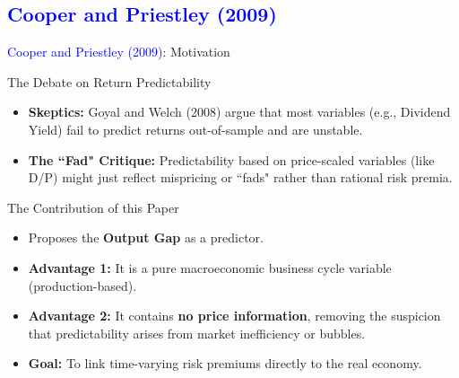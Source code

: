 \documentclass{beamer}
\begin{document}
\subsection{\textcolor{blue}{Cooper and Priestley (2009)}}
\begin{frame}[allowframebreaks]{\textcolor{blue}{Cooper and Priestley (2009)}: Motivation}
    \begin{block}{The Debate on Return Predictability}
        \begin{itemize}
            \item \textbf{Skeptics:} Goyal and Welch (2008) argue that most variables (e.g., Dividend Yield) fail to predict returns out-of-sample and are unstable.
            \item \textbf{The ``Fad" Critique:} Predictability based on price-scaled variables (like D/P) might just reflect mispricing or ``fads" rather than rational risk premia.
        \end{itemize}
    \end{block}
  \framebreak
    \begin{block}{The Contribution of this Paper}
        \begin{itemize}
            \item Proposes the \textbf{Output Gap} as a predictor.
            \item \textbf{Advantage 1:} It is a pure macroeconomic business cycle variable (production-based).
            \item \textbf{Advantage 2:} It contains \textbf{no price information}, removing the suspicion that predictability arises from market inefficiency or bubbles.
            \item \textbf{Goal:} To link time-varying risk premiums directly to the real economy.
        \end{itemize}
    \end{block}
\end{frame}
\end{document}
